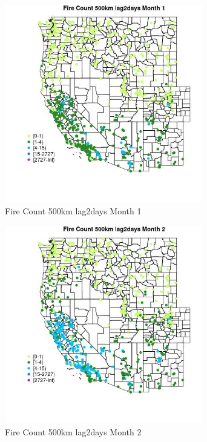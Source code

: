 \begin{figure} 
\centering  
\includegraphics[width=0.77\textwidth]{Code_Outputs/Report_ML_input_PM25_Step4_part_f_de_duplicated_aveswNAs_MapObsMo1Fire_Count_500km_lag2days.jpg} 
\caption{\label{fig:Report_ML_input_PM25_Step4_part_f_de_duplicated_aveswNAsMapObsMo1Fire_Count_500km_lag2days}Fire Count 500km lag2days Month 1} 
\end{figure} 
 

\begin{figure} 
\centering  
\includegraphics[width=0.77\textwidth]{Code_Outputs/Report_ML_input_PM25_Step4_part_f_de_duplicated_aveswNAs_MapObsMo2Fire_Count_500km_lag2days.jpg} 
\caption{\label{fig:Report_ML_input_PM25_Step4_part_f_de_duplicated_aveswNAsMapObsMo2Fire_Count_500km_lag2days}Fire Count 500km lag2days Month 2} 
\end{figure} 
 

